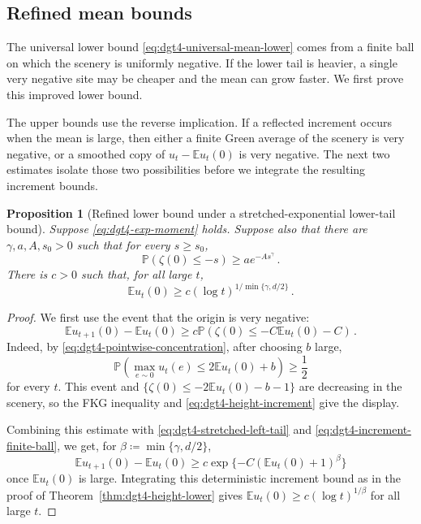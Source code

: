 \documentclass[11pt]{amsart}
\theoremstyle{plain}
\newtheorem{proposition}[theorem]{Proposition}
\theoremstyle{definition}
\newcommand{\E}{\mathbb{E}}
\renewcommand{\P}{\mathbb{P}}
\begin{document}
	\subsection{Refined mean bounds}\label{ssec:d5-height-upper}

	The universal lower bound \eqref{eq:dgt4-universal-mean-lower} comes from
	a finite ball on which the scenery is uniformly negative. If the lower tail
	is heavier, a single very negative site may be cheaper and the mean can grow
	faster. We first prove this improved lower bound.

	The upper bounds use the reverse implication. If a reflected increment occurs
	when the mean is large, then either a finite Green average of the scenery is
	very negative, or a smoothed copy of $u_t-\E u_t(0)$ is very negative.
	The next two estimates isolate those two possibilities before we integrate
	the resulting increment bounds.

		\begin{proposition}[Refined lower bound under a stretched-exponential lower-tail bound]
		\label{prop:dgt4-height-lower-stretched}
			Suppose \eqref{eq:dgt4-exp-moment} holds. Suppose also that there are
			$\gamma,a,A,s_{0}>0$ such that for every $s\geq s_{0}$,
			\begin{equation}\label{eq:dgt4-stretched-left-tail}
				\P(\zeta(0)\leq -s)\geq ae^{-As^\gamma}\, .
			\end{equation}
			There is $c>0$ such that, for all large $t$,
			\[
				\E u_t(0)\geq c(\log t)^{1/\min\{\gamma,d/2\}}\, .
			\]
		\end{proposition}

		\begin{proof}
			We first use the event that the origin is very negative:
			\[
				\E u_{t+1}(0)-\E u_t(0)
				\geq
				c\P(\zeta(0)\leq -C\E u_t(0)-C)\, .
			\]
			Indeed, by \eqref{eq:dgt4-pointwise-concentration}, after choosing $b$ large,
			\[
				\P\left(\max_{e\sim0}u_t(e)\leq2\E u_t(0)+b\right)
				\geq\frac12
			\]
			for every $t$. This event and
			$\{\zeta(0)\leq -2\E u_t(0)-b-1\}$ are decreasing in the scenery,
			so the FKG inequality and \eqref{eq:dgt4-height-increment} give the display.

			Combining this estimate with \eqref{eq:dgt4-stretched-left-tail} and
			\eqref{eq:dgt4-increment-finite-ball}, we get, for
			$\beta\coloneqq\min\{\gamma,d/2\}$,
			\[
				\E u_{t+1}(0)-\E u_t(0)
				\geq
				c\exp\{-C(\E u_t(0)+1)^\beta\}
			\]
			once $\E u_t(0)$ is large. Integrating this deterministic increment
			bound as in the proof of Theorem~\ref{thm:dgt4-height-lower} gives
			$\E u_t(0)\geq c(\log t)^{1/\beta}$ for all large $t$.
		\end{proof}
\end{document}
